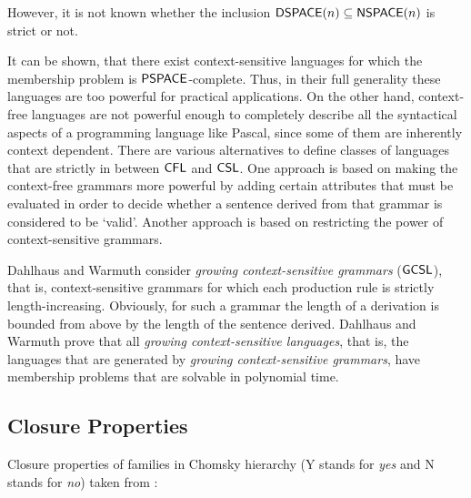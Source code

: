 However, it is not known whether the inclusion $\textup{\sf DSPACE}(n) \subseteq \textup{\sf NSPACE}(n)$ is strict or not.

It can be shown, that there exist context-sensitive languages for which the membership problem is $\textup{\sf PSPACE}$-complete. Thus, in their full generality these languages are too powerful for practical applications. On the other hand, context-free languages are not powerful enough to completely describe all the syntactical aspects of a programming language like Pascal, since some of them are inherently context dependent. There are various alternatives to define classes of languages that are strictly in between $\textup{\sf CFL}$ and $\textup{\sf CSL}$. One approach is based on making the context-free grammars more powerful by adding certain attributes that must be evaluated in order to decide whether a sentence derived from that grammar is considered to be `valid'. Another approach is based on restricting the power of context-sensitive grammars.

Dahlhaus and Warmuth \citep{DW86} consider \emph{growing context-sensitive grammars} \index{$\GCSL$}($\GCSL$), that is, context-sensitive grammars for which each production rule is strictly length-increasing. Obviously, for such a grammar the length of a derivation is bounded from above by the length of the sentence derived. Dahlhaus and Warmuth prove that all \emph{growing context-sensitive languages}, that is, the languages that are generated by \emph{growing context-sensitive grammars}, have membership problems that are solvable in polynomial time.

\subsection{Closure Properties}
\label{subsection:closure-properties}

Closure properties of families in Chomsky hierarchy
(Y stands for \emph{yes} and N stands for \emph{no}) taken from \citep{MaSa1997formal}:

